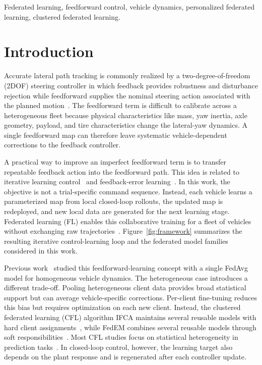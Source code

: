 \begin{IEEEkeywords}
Federated learning, feedforward control, vehicle dynamics, personalized federated learning, clustered federated learning.
\end{IEEEkeywords}

\section{Introduction}
\label{sec:introduction}
Accurate lateral path tracking is commonly realized by a two-degree-of-freedom (2DOF) steering controller in which feedback provides robustness and disturbance rejection while feedforward supplies the nominal steering action associated with the planned motion~\cite{kapania2015design}.
The feedforward term is difficult to calibrate across a heterogeneous fleet because physical characteristics like mass, yaw inertia, axle geometry, payload, and tire characteristics change the lateral-yaw dynamics.
A single feedforward map can therefore leave systematic vehicle-dependent corrections to the feedback controller.

A practical way to improve an imperfect feedforward term is to transfer repeatable feedback action into the feedforward path.
This idea is related to iterative learning control~\cite{arimoto1984bettering,bristow2006survey} and feedback-error learning~\cite{kawato1987hierarchical,miyamoto1988feedback}.
In this work, the objective is not a trial-specific command sequence.
Instead, each vehicle learns a parameterized map from local closed-loop rollouts, the updated map is redeployed, and new local data are generated for the next learning stage.
Federated learning (FL) enables this collaborative training for a fleet of vehicles without exchanging raw trajectories~\cite{mcmahan2017communication,kairouz2021advances,weber2024_survey}.
Figure~\ref{fig:framework} summarizes the resulting iterative control-learning loop and the federated model families considered in this work.

Previous work~\cite{weber2025_fed_FF} studied this feedforward-learning concept with a single FedAvg model for homogeneous vehicle dynamics.
The heterogeneous case introduces a different trade-off.
Pooling heterogeneous client data provides broad statistical support but can average vehicle-specific corrections.
Per-client fine-tuning reduces this bias but requires optimization on each new client.
Instead, the clustered federated learning (CFL) algorithm IFCA maintains several reusable models with hard client assignments~\cite{ghosh2020_IFCA}, while FedEM combines several reusable models through soft responsibilities~\cite{marfoq2021_FedEM}.
Most CFL studies focus on statistical heterogeneity in prediction tasks~\cite{el-rifai2025survey}.
In closed-loop control, however, the learning target also depends on the plant response and is regenerated after each controller update.

